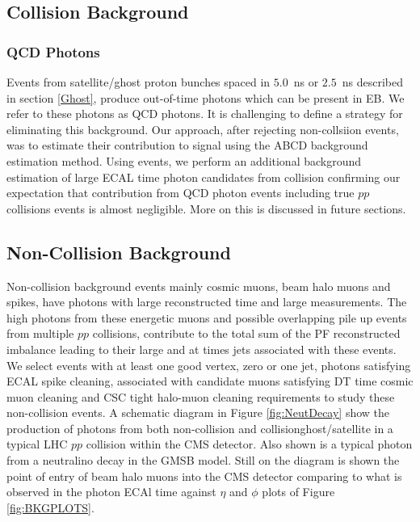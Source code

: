 \subsection{Collision Background}
\subsubsection{QCD Photons}
Events from satellite/ghost proton bunches spaced in $5.0$~ns or $2.5$~ns described in section \ref{Ghost}, produce out-of-time photons which can be present in EB. We refer to these photons as QCD photons. It is challenging to define a strategy for eliminating this background. Our approach, after rejecting non-collsiion events, was to estimate their contribution to signal using the \textsf{ABCD} background estimation method. Using \PZ events, we perform an additional background estimation of large ECAL time photon candidates from collision confirming our expectation that contribution from QCD photon events including true $pp$ collisions events is almost negligible. More on this is discussed in future sections.
\subsection{Non-Collision Background}
Non-collision background events mainly cosmic muons, beam halo muons and spikes, have photons with large reconstructed time and large \ETslash\hspace{0.15cm} measurements. The high \pt photons from these energetic muons and possible overlapping  pile up events from multiple $pp$ collisions, contribute to the total sum of the PF reconstructed \pt imbalance leading to their large \ETslash\hspace{0.15cm} and at times jets associated with these events.
We select events with at least one good vertex, zero or one jet, photons satisfying ECAL spike cleaning, associated with candidate muons satisfying DT time cosmic muon cleaning and CSC tight halo-muon cleaning requirements to study these non-collision events. 
A schematic diagram in Figure \ref{fig:NeutDecay} show the production of photons from both non-collision and collision{ghost/satellite} in a typical LHC $pp$ collision within the CMS detector. Also shown is a typical photon from a neutralino decay in the GMSB model. Still on the diagram is shown the point of entry of beam halo muons into the CMS detector comparing to what is observed in the photon ECAl time against $\eta$ and $\phi$ plots of Figure \ref{fig:BKGPLOTS}.

